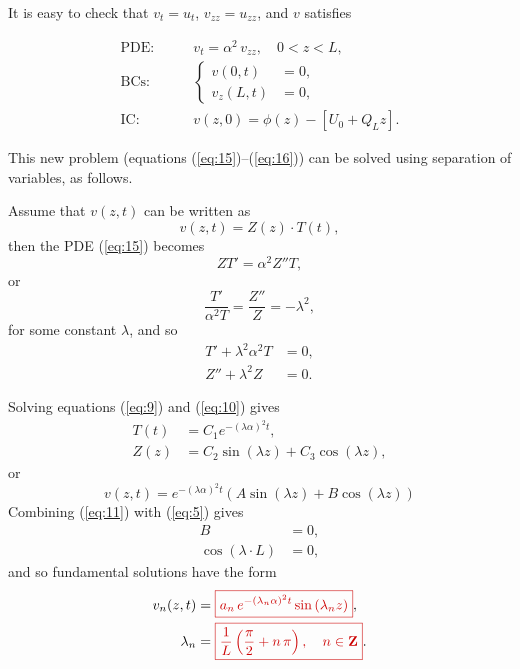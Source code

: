 \documentclass{article}
\newcommand{\highlight}[1]{{\color{red!80!black} \fbox{$ \displaystyle #1 $} }}
\begin{document}
It is easy to check that $v_{t} = u_{t}$, $v_{zz} = u_{zz}$, and $v$ satisfies

\begin{align}
\label{eq:15}
  \text{PDE:} \qquad & v_{t} = \alpha^{2}\, v_{zz},\quad 0 < z < L,\\
  \label{eq:5}
  \text{BCs:} \qquad &\left\{
                       \begin{aligned}
                         v(0,t) &= 0,\\
                         v_{z}(L,t) &= 0,
                       \end{aligned}\right.\\
\label{eq:16}
  \text{IC:} \qquad & v(z,0) = \phi(z) - [U_{0} + Q_{L}z].
\end{align}

This new problem (equations (\ref{eq:15})--(\ref{eq:16})) can be solved using separation of variables, as follows.

Assume that $v(z,t)$ can be written as
\begin{equation}
  \label{eq:6}
  v(z,t) = Z(z)\cdot T(t),
\end{equation}
then the PDE (\ref{eq:15}) becomes
\begin{equation}
  \label{eq:7}
  ZT' = \alpha^{2}Z''T,
\end{equation}
or
\begin{equation}
  \label{eq:8}
  \frac{T'}{\alpha^{2}T} = \frac{Z''}{Z} = -\lambda^{2},
\end{equation}
for some constant $\lambda$, and so
\begin{align}
  \label{eq:9}
  T' + \lambda^{2}\alpha^{2}T &= 0,\\
  \label{eq:10}
  Z'' + \lambda^{2}Z &= 0.
\end{align}

Solving equations (\ref{eq:9}) and (\ref{eq:10}) gives
\begin{align}
  T(t) &= C_{1}e^{-(\lambda\alpha)^{2}t},\\
  Z(z) &= C_{2}\sin(\lambda z) + C_{3}\cos(\lambda z),
\end{align}
or
\begin{equation}
  \label{eq:11}
  v(z,t) = e^{-(\lambda\alpha)^{2}t}\left( A\sin(\lambda z) + B\cos(\lambda z) \right)
\end{equation}
Combining (\ref{eq:11}) with (\ref{eq:5}) gives
\begin{align}
  B &= 0,\\
  \cos(\lambda\cdot L) &= 0,
\end{align}
and so fundamental solutions have the form
\begin{align}
  \label{eq:12}
  v_{n}(z,t) &= \highlight{a_{n}\,e^{-(\lambda_{n}\alpha)^{2}t}\sin\left( \lambda_{n} z \right)},\\
  \lambda_{n} &= \highlight{\frac{1}{L} \left( \frac{\pi}{2} + n\,\pi \right),\quad n \in \mathbf{Z}}.
\end{align}
\end{document}
